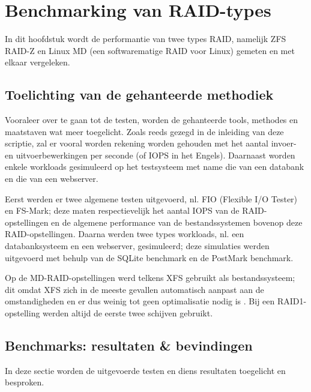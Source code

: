 

\chapter{Benchmarking van RAID-types}
\label{ch:h8}

In dit hoofdstuk wordt de performantie van twee types RAID, namelijk ZFS RAID-Z en Linux MD (een softwarematige RAID voor Linux) gemeten en met elkaar vergeleken.

\section{Toelichting van de gehanteerde methodiek}

Vooraleer over te gaan tot de testen, worden de gehanteerde tools, methodes en maatstaven wat meer toegelicht. Zoals reeds gezegd in de inleiding van deze scriptie, zal er vooral worden rekening worden gehouden met het aantal invoer- en uitvoerbewerkingen per seconde (of IOPS in het Engels). Daarnaast worden enkele workloads gesimuleerd op het testsysteem met name die van een databank en die van een webserver.  

Eerst werden er twee algemene testen uitgevoerd, nl. FIO (Flexible I/O Tester) en FS-Mark; deze maten respectievelijk het aantal IOPS van de RAID-opstellingen en de algemene performance van de bestandssystemen bovenop deze RAID-opstellingen. Daarna werden twee types workloads, nl. een databanksysteem en een webserver, gesimuleerd; deze simulaties werden uitgevoerd met behulp van de SQLite benchmark en de PostMark benchmark.

Op de MD-RAID-opstellingen werd telkens XFS gebruikt als bestandssysteem; dit omdat XFS zich in de meeste gevallen automatisch aanpast aan de omstandigheden en er dus weinig tot geen optimalisatie nodig is \autocite{XFSCommunity2016}. Bij een RAID1-opstelling werden altijd de eerste twee schijven gebruikt.

\section{Benchmarks: resultaten \& bevindingen}

In deze sectie worden de uitgevoerde testen en diens resultaten toegelicht en besproken.


